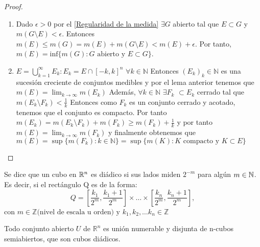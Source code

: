 \begin{proof}
    \leavevmode 
    \begin{enumerate}
    \item Dado $\epsilon > 0$ por el \cref{Regularidad de la medida} $\exists G$ abierto tal que $E \subset G$ y $m(G \setminus E) < \epsilon$. Entonces $m(E) \leq m(G) = m(E) + m(G \setminus E) < m(E) + \epsilon$. Por tanto, $m(E) = \text{inf}\{m(G) : G \text{ abierto y } E \subset G\}$.
    \item   $E = \bigcup_{k = 1}^{\infty} E_k : E_k = E \cap [-k, k]^n$ $\forall k \in \mathbb{N}$
    Entonces $(E_k)_k \in \mathbb{N}$ es una sucesión creciente de conjuntos medibles y por el lema anterior tenemos que $m(E) = \lim_{k \to \infty} m(E_k)$
    Además, $\forall k \in \mathbb{N}$ $\exists F_k$ $ \subset E_k$ cerrado tal que $m(E_k \setminus F_k) < \frac{1}{k}$
    Entonces como $F_k$ es un conjunto cerrado y acotado, tenemos que el conjunto es compacto.
    Por tanto $m(E_k) = m(E_k \setminus F_k) + m(F_k) \geq m(F_k) + \frac{1}{k}$ y por tanto $m(E) = \lim_{k \to \infty} m(F_k)$ y finalmente obtenemos que
    $m(E) = \sup\{m(F_k) : k \in \mathbb{N} \} = \sup\{m(K) : K \text{ compacto y } K \subset E\}$
    \end{enumerate}  
\end{proof}

\begin{definición}
Se dice que un cubo en $\mathbb{R}^n$ es diádico si sus lados miden $2^{-m}$ para algún $m \in \mathbb{N}$.
Es decir, si el rectángulo Q es de la forma:
\[Q = \left[\frac{k_1}{2^m}, \frac{k_1 + 1}{2^m}\right] \times \dots \times \left[\frac{k_n}{2^m}, \frac{k_n + 1}{2^m}\right],\]
con $m \in \mathbb{Z} \text{(nivel de escala u orden) y } k_1, k_2, \dots k_n
    \in \mathbb{Z}$
\end{definición}

\begin{teorema}
    Todo conjunto abierto $U$ de $\mathbb{R}^n$ es unión numerable y disjunta de n-cubos semiabiertos, que son cubos diádicos.
\end{teorema}

